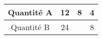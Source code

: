 \begin{tabular}{|c|c|c|c|}
\hline
Quantité A & 12 & 8 & 4 \\ \hline
Quantité B & 24 & \kern1cm & 8 \\ \hline
\end{tabular}

